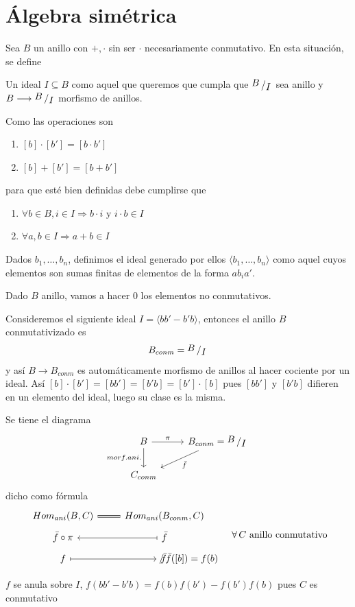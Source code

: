 \section{\'Algebra sim\'etrica}
Sea $B$ un anillo con $+, \cdot$ sin ser $\cdot$ necesariamente conmutativo. En esta situaci\'on, se define 
\begin{defi}
    Un ideal $I\subseteq B$ como aquel que queremos que cumpla que $\modulo{B}{I}$ sea anillo y $B \longrightarrow \modulo{B}{I}$ morfismo de anillos. 
\end{defi}
\begin{obs}
    Como las operaciones son
    \begin{enumerate}
        \item $[b]\cdot [b'] = [b\cdot b']$
        \item $[b]+[b'] = [b+b']$
    \end{enumerate}
    para que est\'e bien definidas debe cumplirse que 
    \begin{enumerate}
        \item $\forall b\in B, i \in I \Rightarrow b\cdot i \text{ y } i \cdot b \in I$
        \item $\forall a,b \in I \Rightarrow a+b\in I$
    \end{enumerate}
\end{obs}
\begin{defi}
    Dados $b_1, \ldots, b_n$, definimos el ideal generado por ellos $\langle b_1, \ldots, b_n\rangle$ como aquel cuyos elementos son sumas finitas de elementos de la forma $a b_i a'$. 
\end{defi}
Dado $B$ anillo, vamos a hacer 0 los elementos no conmutativos. 
\begin{defi} Consideremos el siguiente ideal $I=\langle bb'-b'b \rangle$, entonces el anillo $B$ conmutativizado es
    $$B_{conm} = \modulo{B}{I}$$
y as\'i $B \longrightarrow B_{conm}$ es autom\'aticamente morfismo de anillos al hacer cociente por un ideal. As\'i $[b]\cdot[b'] = [bb'] = [b'b] = [b']\cdot [b]$ pues $[bb']$ y $[b'b]$ difieren en un elemento del ideal, luego su clase es la misma.
\end{defi}
\begin{propi}
    Se tiene el diagrama
    $$\bt B \arrow{r}{\pi} \arrow{d}[swap]{morf. ani.} & B_{conm} = \modulo{B}{I} \arrow{dl}{\bar f} \\ C_{conm} \et$$
    dicho como f\'ormula
    $$\bt Hom_{ani}(B,C) \arrow[equal]{r} & Hom_{ani} (B_{conm}, C) \\[-5mm] \bar f\circ \pi & \arrow[mapsto]{l} \bar f \\[-5mm] f \arrow[mapsto]{r} & \bar f \, &[-28mm] / \, \bar f([b]) = f(b) \et \quad \forall \, C \text{ anillo conmutativo}  $$
\end{propi}
\begin{dem}
    $f$ se anula sobre $I$, $f(bb'-b'b) = f(b)f(b') - f(b')f(b)$ pues $C$ es conmutativo 
\end{dem}

